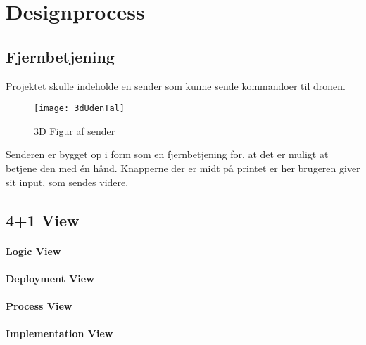 \documentclass[Main]{subfiles}
\begin{document}
\section{Designprocess}



\subsection{Fjernbetjening}

Projektet skulle indeholde en sender som kunne sende kommandoer til dronen.

\begin{figure}[H]
\centering
\texttt{[image: 3dUdenTal]}
\caption{3D Figur af sender}
\label{Fig:3dUdenTal}
\end{figure}


Senderen er bygget op i form som en fjernbetjening for, at det er muligt at betjene den med én hånd.
Knapperne der er midt på printet er her brugeren giver sit input, som sendes videre.


\subsection{4+1 View}


\paragraph{Logic View}


\paragraph{Deployment View}


\paragraph{Process View}


\paragraph{Implementation View}
\end{document}
